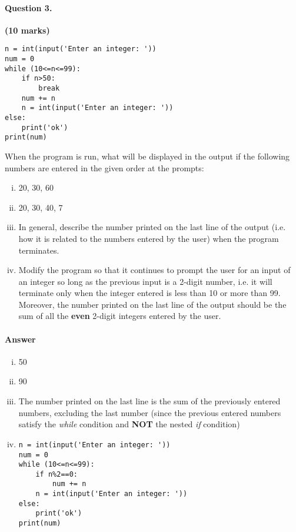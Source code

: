 \documentclass[12pt]{article}
\begin{document}
\paragraph{Question 3.}\hfill {\bf (10 marks)}
\\\begin{verbatim}
n = int(input('Enter an integer: '))
num = 0
while (10<=n<=99):
    if n>50:
        break
    num += n
    n = int(input('Enter an integer: '))
else:
    print('ok')
print(num)
\end{verbatim}
When the program is run, what will be displayed in the output if the following numbers are entered in the given order at the prompts:
\begin{enumerate}[(i)]
\item 20, 30, 60
\item 20, 30, 40, 7
\item In general, describe the number printed on the last line of the output (i.e. how it is related to the numbers entered by the user) when the program terminates.
\item Modify the program so that it continues to prompt the user for an input of an integer so long as the previous input is a 2-digit number, i.e. it will terminate only when the integer entered is less than 10 or more than 99. Moreover, the number printed on the last line of the output should be the sum of all the \textbf{even} 2-digit integers entered by the user.
\end{enumerate}
\paragraph{Answer}
\begin{enumerate}[(i)]
\item 50
\item 90
\item The number printed on the last line is the sum of the previously entered numbers, excluding the last number (since the previous entered numbers satisfy the \textit{while} condition and \textbf{NOT} the nested \textit{if} condition)
\item \begin{verbatim}
n = int(input('Enter an integer: '))
num = 0
while (10<=n<=99):
    if n%2==0:
        num += n
    n = int(input('Enter an integer: '))
else:
    print('ok')
print(num)
\end{verbatim}
\end{enumerate}
\end{document}
